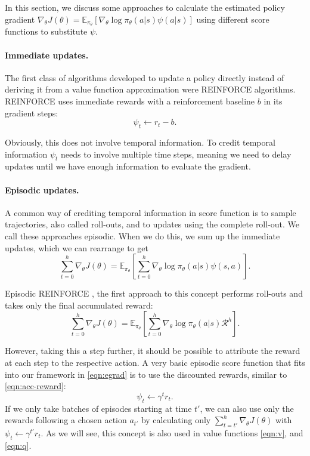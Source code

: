In this section, we discuss some approaches to calculate the estimated policy gradient $\nabla_\theta J(\theta) = \mathbb{E}_{\pi_\theta}\left[\nabla_\theta{\log\pi_\theta(a|s)}\psi(a|s)\right]$ using different score functions to substitute $\psi$.

\paragraph{Immediate updates.} The first class of algorithms developed to update a policy directly instead of deriving it from a value function approximation were REINFORCE \cite{Williams92simplestatistical} algorithms. REINFORCE uses immediate rewards with a reinforcement baseline $b$ in its gradient steps:
\begin{equation}
  \psi_t \leftarrow r_t-b.
\end{equation}

Obviously, this does not involve temporal information. To credit temporal information $\psi_t$ needs to involve multiple time steps, meaning we need to delay updates until we have enough information to evaluate the gradient.

\paragraph{Episodic updates.} A common way of crediting temporal information in score function is to sample trajectories, also called roll-outs, and to updates using the complete roll-out. We call these approaches episodic. When we do this, we sum up the immediate updates, which we can rearrange to get
\begin{equation}
  \sum_{t=0}^h \nabla_\theta J(\theta) = \mathbb{E}_{\pi_\theta}\left[\sum_{t=0}^h \nabla_\theta{\log\pi_\theta(a|s)}\psi(s,a)\right].
  \label{eqn:egrad}
\end{equation}

Episodic REINFORCE \cite{Williams92simplestatistical}, the first approach to this concept performs roll-outs and takes only the final accumulated reward:
\begin{equation}
  \sum_{t=0}^h \nabla_\theta J(\theta) = \mathbb{E}_{\pi_\theta}\left[\sum_{t=0}^h \nabla_\theta\log\pi_\theta(a|s) \mathcal{R}^h \right].
\end{equation}

However, taking this a step further, it should be possible to attribute the reward at each step to the respective action. A very basic episodic score function that fits into our framework in \eqref{eqn:egrad} is to use the discounted rewards, similar to \eqref{eqn:acc-reward}:
\begin{equation}
  \psi_t \leftarrow \gamma^t r_t.
\end{equation}
If we only take batches of episodes starting at time $t'$, we can also use only the rewards following a chosen action $a_{t'}$ by calculating only $\sum_{t=t'}^h \nabla_\theta J(\theta)$ with $\psi_t \leftarrow \gamma^{t'} r_{t}$. As we will see, this concept is also used in value functions \eqref{eqn:v}, and \eqref{eqn:q}.

